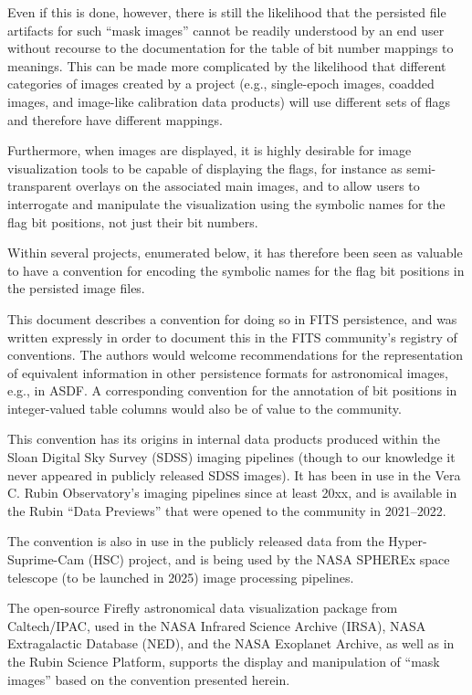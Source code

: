 \documentclass[DM,authoryear,toc]{lsstdoc}
\begin{document}
Even if this is done, however, there is still the likelihood that the
persisted file artifacts for such ``mask images'' cannot be readily
understood by an end user without recourse to the documentation for
the table of bit number mappings to meanings.
This can be made more complicated by the likelihood that different
categories of images created by a project (e.g., single-epoch images,
coadded images, and image-like calibration data products) will use
different sets of flags and therefore have different mappings.

Furthermore, when images are displayed, it is highly desirable for
image visualization tools to be capable of displaying the flags,
for instance as semi-transparent overlays on the associated main
images, and to allow users to interrogate and manipulate the
visualization using the symbolic names for the flag bit positions,
not just their bit numbers.

Within several projects, enumerated below, it has therefore been seen
as valuable to have a convention for encoding the symbolic names for
the flag bit positions in the persisted image files.

This document describes a convention for doing so in FITS persistence,
and was written expressly in order to document this in the FITS
community's registry of conventions.
The authors would welcome recommendations for the representation of
equivalent information in other persistence formats for astronomical
images, e.g., in ASDF.
A corresponding convention for the annotation of bit positions in
integer-valued table columns would also be of value to the community.

This convention has its origins in internal data products produced
within the Sloan Digital Sky Survey (SDSS) imaging pipelines (though
to our knowledge it never appeared in publicly released SDSS images).
It has been in use in the Vera C. Rubin Observatory's imaging
pipelines since at least 20xx, and is available in the Rubin ``Data
Previews'' that were opened to the community in 2021--2022.

The convention is also in use in the publicly released data from
the Hyper-Suprime-Cam (HSC) project, and is being used by the NASA
SPHEREx space telescope (to be launched in 2025) image processing
pipelines.

The open-source Firefly astronomical data visualization package
from Caltech/IPAC, used in the NASA Infrared Science Archive (IRSA),
NASA Extragalactic Database (NED), and the NASA Exoplanet Archive,
as well as in the Rubin Science Platform, supports the display and
manipulation of ``mask images'' based on the convention presented
herein.
\end{document}
